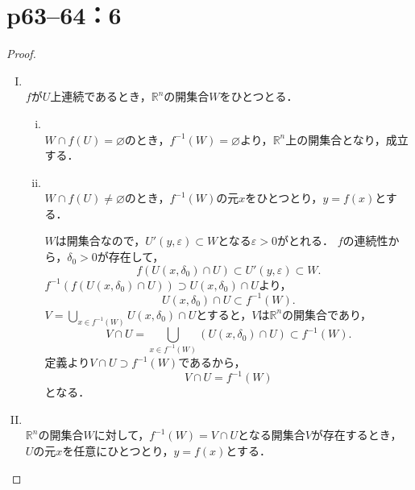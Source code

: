 \section*{p63--64：6} \label{p63--64：6}

\begin{leftbar}
    \begin{proof} \mbox{　}
        \begin{enumerate}[(I)]
            \item \mbox{} \\
                  $f$が$U$上連続であるとき，$\mathbb{R}^n$の開集合$W$をひとつとる．
                  \begin{enumerate}[(i)]
                      \item \mbox{} \\
                            $W \cap f(U) = \varnothing$のとき，$f^{-1} (W) = \varnothing$より，$\mathbb{R}^n$上の開集合となり，成立する．
                      \item \mbox{} \\
                            $W \cap f(U) \ne \varnothing$のとき，$f^{-1} (W)$の元$x$をひとつとり，$y=f(x)$とする．

                            $W$は開集合なので，$U'(y,\varepsilon) \subset W$となる$\varepsilon >0$がとれる．
                            $f$の連続性から，$\delta_0 >0$が存在して，
                            \[
                                f(U(x,\delta_0) \cap U) \subset U'(y,\varepsilon) \subset W.
                            \]
                            $f^{-1} (f(U(x,\delta_0) \cap U)) \supset U(x,\delta_0) \cap U$より，
                            \[
                                U(x,\delta_0) \cap U \subset f^{-1} (W).
                            \]
                            $V = \bigcup_{x \in f^{-1}(W)} U(x,\delta_0) \cap U$とすると，$V$は$\mathbb{R}^n$の開集合であり，
                            \[
                                V \cap U = \bigcup_{x \in f^{-1}(W)} (U(x,\delta_0) \cap U)  \subset f^{-1} (W).
                            \]
                            定義より$V \cap U \supset f^{-1} (W)$であるから，
                            \[
                                V \cap U = f^{-1} (W)
                            \]
                            となる．
                  \end{enumerate}
            \item \mbox{} \\
                  $\mathbb{R}^n$の開集合$W$に対して，$f^{-1}(W)=V \cap U$となる開集合$V$が存在するとき，
                  $U$の元$x$を任意にひとつとり，$y=f(x)$とする．


\end{enumerate}
\end{proof}
\end{leftbar}
